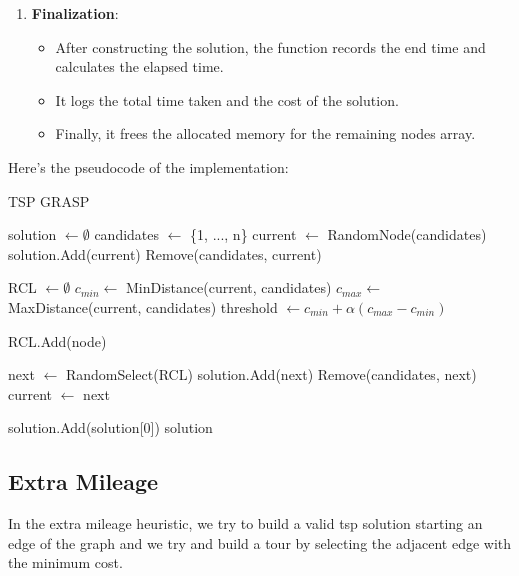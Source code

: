 \documentclass{article}
\begin{document}
\begin{enumerate}
	\item \textbf{Finalization}:
	      \begin{itemize}
		      \item After constructing the solution, the function records the end time and calculates the elapsed time.
		      \item It logs the total time taken and the cost of the solution.
		      \item Finally, it frees the allocated memory for the remaining nodes array.
	      \end{itemize}
\end{enumerate}

Here's the pseudocode of the implementation:

\begin{algorithm}[!ht]
\caption{TSP GRASP}
\begin{algorithmic}[1]
\State solution $\gets \emptyset$
\State candidates $\gets$ \{1, ..., n\} 
\State current $\gets$ RandomNode(candidates)
\State solution.Add(current)
\State Remove(candidates, current)

    \State RCL $\gets \emptyset$ 
    \State $c_{min} \gets$ MinDistance(current, candidates)
    \State $c_{max} \gets$ MaxDistance(current, candidates)
    \State threshold $\gets c_{min} + \alpha(c_{max} - c_{min})$
    
            \State RCL.Add(node)
        \EndIf
    \EndFor
    
    \State next $\gets$ RandomSelect(RCL)
    \State solution.Add(next)
    \State Remove(candidates, next)
    \State current $\gets$ next
\EndWhile

\State solution.Add(solution[0]) 
\State \Return solution
\EndProcedure
\end{algorithmic}
\end{algorithm}

\newpage

\subsection{Extra Mileage}
In the extra mileage heuristic, we try to build a valid tsp solution starting an edge of the graph and we try and build a 
tour by selecting the adjacent edge with the minimum cost.
\end{document}
